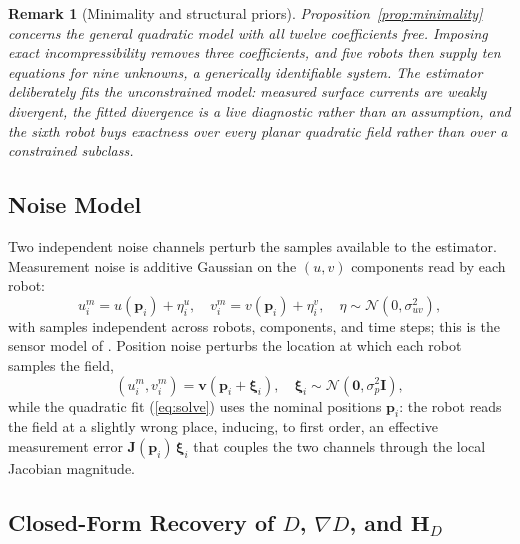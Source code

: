 \documentclass[lettersize,journal]{IEEEtran}
\newtheorem{remark}{Remark}
\begin{document}
\begin{remark}[Minimality and structural priors]
\label{rem:minimality_priors}
Proposition~\ref{prop:minimality} concerns the general quadratic model
with all twelve coefficients free. Imposing exact incompressibility
removes three coefficients, and five robots then supply ten equations
for nine unknowns, a generically identifiable system. The estimator
deliberately fits the unconstrained model: measured surface currents
are weakly divergent, the fitted divergence is a live diagnostic rather
than an assumption, and the sixth robot buys exactness over every
planar quadratic field rather than over a constrained subclass.
\end{remark}

\subsection{Noise Model}
\label{sec:noise_model}

Two independent noise channels perturb the samples available to the
estimator. Measurement noise is additive Gaussian on the $(u, v)$
components read by each robot:
\begin{equation}
    u_i^m = u(\mathbf{p}_i) + \eta_i^u, \quad
    v_i^m = v(\mathbf{p}_i) + \eta_i^v,
    \quad \eta \sim \mathcal{N}(0, \sigma_{uv}^2),
    \label{eq:meas_noise}
\end{equation}
with samples independent across robots, components, and time steps; this
is the sensor model of \cite{9}. Position noise perturbs the location at
which each robot samples the field,
\begin{equation}
    (u_i^m, v_i^m) = \mathbf{v}(\mathbf{p}_i + \boldsymbol{\xi}_i), \quad
    \boldsymbol{\xi}_i \sim \mathcal{N}(\mathbf{0}, \sigma_p^2 \mathbf{I}),
    \label{eq:pos_noise}
\end{equation}
while the quadratic fit (\ref{eq:solve}) uses the nominal positions
$\mathbf{p}_i$: the robot reads the field at a slightly wrong place,
inducing, to first order, an effective measurement error
$\mathbf{J}(\mathbf{p}_i)\,\boldsymbol{\xi}_i$ that couples the two
channels through the local Jacobian magnitude.

\subsection{Closed-Form Recovery of $D$, $\nabla D$, and $\mathbf{H}_D$}
\end{document}
